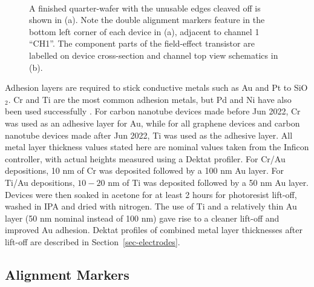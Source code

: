 \documentclass[
  a4paper,
]{scrbook}
\begin{document}
\begin{figure}
\begin{minipage}[t]{0.45\linewidth}
{{}

}

\end{minipage}%
%
\begin{minipage}[t]{0.01\linewidth}

{\centering 

~

}

\end{minipage}%

\caption[A quarter-wafer of devices next to a schematic of a
field-effect transistor
post-fabrication.]{\label{fig-field-effect-transistor}A finished
quarter-wafer with the unusable edges cleaved off is shown in (a). Note
the double alignment markers feature in the bottom left corner of each
device in (a), adjacent to channel 1 ``CH1''. The component parts of the
field-effect transistor are labelled on device cross-section and channel
top view schematics in (b).}

\end{figure}

Adhesion layers are required to stick conductive metals such as Au and
Pt to SiO\(_2\). Cr and Ti are the most common adhesion metals, but Pd
and Ni have also been used successfully
\autocite{Guarnieri2014,Shkodra2021}. For carbon nanotube devices made
before Jun 2022, Cr was used as an adhesive layer for Au, while for all
graphene devices and carbon nanotube devices made after Jun 2022, Ti was
used as the adhesive layer. All metal layer thickness values stated here
are nominal values taken from the Inficon controller, with actual
heights measured using a Dektat profiler. For Cr/Au depositions, 10 nm
of Cr was deposited followed by a 100 nm Au layer. For Ti/Au
depositions, \(10-20\) nm of Ti was deposited followed by a 50 nm Au
layer. Devices were then soaked in acetone for at least 2 hours for
photoresist lift-off, washed in IPA and dried with nitrogen. The use of
Ti and a relatively thin Au layer (50 nm nominal instead of 100 nm) gave
rise to a cleaner lift-off and improved Au adhesion. Dektat profiles of
combined metal layer thicknesses after lift-off are described in
Section~\ref{sec-electrodes}.

\hypertarget{sec-align}{%
\subsection{Alignment Markers}\label{sec-align}}
\end{document}
